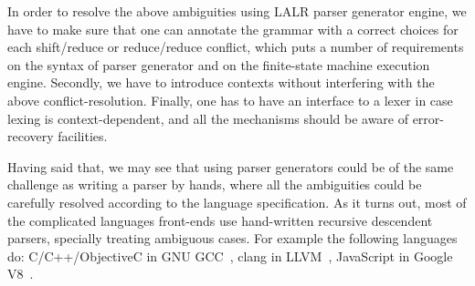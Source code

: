 In order to resolve the above ambiguities using LALR parser generator
engine, we have to make sure that one can annotate the grammar with a
correct choices for each shift/reduce or reduce/reduce conflict, which
puts a number of requirements on the syntax of parser generator and on
the finite-state machine execution engine.  Secondly, we have to
introduce contexts without interfering with the above
conflict-resolution.  Finally, one has to have an interface to a lexer
in case lexing is context-dependent, and all the mechanisms should be
aware of error-recovery facilities.

Having said that, we may see that using parser generators could be of
the same challenge as writing a parser by hands, where all the
ambiguities could be carefully resolved according to the language
specification.  As it turns out, most of the complicated languages
front-ends use hand-written recursive descendent parsers, specially
treating ambiguous cases.  For example the following languages do:
C/C++/ObjectiveC in GNU GCC~\cite{gcc}, clang in LLVM~\cite{clang}, 
JavaScript in Google V8~\cite{v8}.

